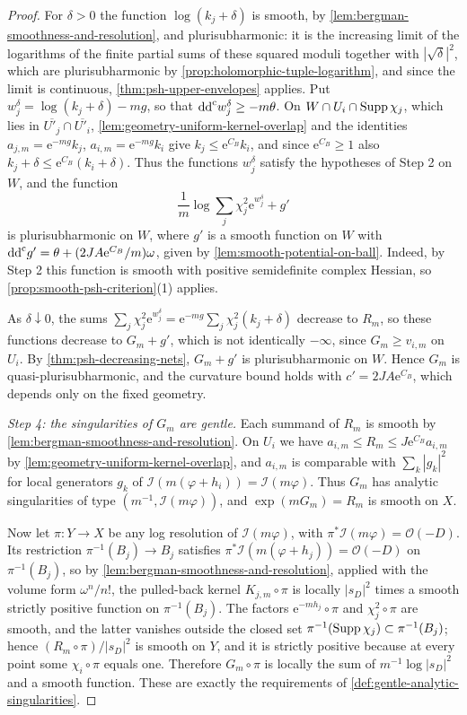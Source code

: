 \begin{proof}
For $\delta>0$ the function $\log(k_j+\delta)$ is smooth, by \cref{lem:bergman-smoothness-and-resolution}, and plurisubharmonic: it is the increasing limit of the logarithms of the finite partial sums of these squared moduli together with $|\sqrt\delta|^2$, which are plurisubharmonic by \cref{prop:holomorphic-tuple-logarithm}, and since the limit is continuous, \cref{thm:psh-upper-envelopes} applies. Put $w_j^\delta=\log(k_j+\delta)-mg$, so that $\mathrm{dd}^{\mathrm{c}} w_j^\delta\geq-m\theta$. On $W\cap U_i\cap\operatorname{Supp}\chi_j$, which lies in $\overline{U'_j}\cap\overline{U'_i}$, \cref{lem:geometry-uniform-kernel-overlap} and the identities $a_{j,m}=\mathrm e^{-mg}k_j$, $a_{i,m}=\mathrm e^{-mg}k_i$ give $k_j\leq\mathrm e^{C_B}k_i$, and since $\mathrm e^{C_B}\geq1$ also $k_j+\delta\leq\mathrm e^{C_B}(k_i+\delta)$. Thus the functions $w_j^\delta$ satisfy the hypotheses of Step 2 on $W$, and the function
\[
 \frac1m\log\sum_j\chi_j^2\mathrm e^{w_j^\delta}+g'
\]
is plurisubharmonic on $W$, where $g'$ is a smooth function on $W$ with $\mathrm{dd}^{\mathrm{c}} g'=\theta+(2JA\mathrm e^{C_B}/m)\omega$, given by \cref{lem:smooth-potential-on-ball}. Indeed, by Step 2 this function is smooth with positive semidefinite complex Hessian, so \cref{prop:smooth-psh-criterion}(1) applies.

As $\delta\downarrow0$, the sums $\sum_j\chi_j^2\mathrm e^{w_j^\delta}=\mathrm e^{-mg}\sum_j\chi_j^2(k_j+\delta)$ decrease to $R_m$, so these functions decrease to $G_m+g'$, which is not identically $-\infty$, since $G_m\geq v_{i,m}$ on $U_i$. By \cref{thm:psh-decreasing-nets}, $G_m+g'$ is plurisubharmonic on $W$. Hence $G_m$ is quasi-plurisubharmonic, and the curvature bound holds with $c'=2JA\mathrm e^{C_B}$, which depends only on the fixed geometry.

\emph{Step 4: the singularities of $G_m$ are gentle.} Each summand of $R_m$ is smooth by \cref{lem:bergman-smoothness-and-resolution}. On $U_i$ we have $a_{i,m}\leq R_m\leq J\mathrm e^{C_B}a_{i,m}$ by \cref{lem:geometry-uniform-kernel-overlap}, and $a_{i,m}$ is comparable with $\sum_k|g_k|^2$ for local generators $g_k$ of $\mathcal I(m(\varphi+h_i))=\mathcal I(m\varphi)$. Thus $G_m$ has analytic singularities of type $(m^{-1},\mathcal I(m\varphi))$, and $\exp(mG_m)=R_m$ is smooth on $X$.

Now let $\pi\colon Y\to X$ be any log resolution of $\mathcal I(m\varphi)$, with $\pi^*\mathcal I(m\varphi)=\mathcal O(-D)$. Its restriction $\pi^{-1}(B_j)\to B_j$ satisfies $\pi^*\mathcal I(m(\varphi+h_j))=\mathcal O(-D)$ on $\pi^{-1}(B_j)$, so by \cref{lem:bergman-smoothness-and-resolution}, applied with the volume form $\omega^n/n!$, the pulled-back kernel $K_{j,m}\circ\pi$ is locally $|s_D|^2$ times a smooth strictly positive function on $\pi^{-1}(B_j)$. The factors $\mathrm e^{-mh_j}\circ\pi$ and $\chi_j^2\circ\pi$ are smooth, and the latter vanishes outside the closed set $\pi^{-1}(\operatorname{Supp}\chi_j)\subset\pi^{-1}(B_j)$; hence $(R_m\circ\pi)/|s_D|^2$ is smooth on $Y$, and it is strictly positive because at every point some $\chi_i\circ\pi$ equals one. Therefore $G_m\circ\pi$ is locally the sum of $m^{-1}\log|s_D|^2$ and a smooth function. These are exactly the requirements of \cref{def:gentle-analytic-singularities}.
\end{proof}
